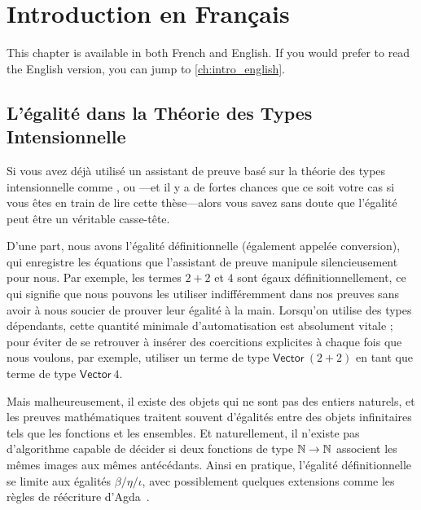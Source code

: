 \setchapterpreamble[u]{\margintoc}
\chapter{Introduction en Français}

\begin{kaobox}
  This chapter is available in both French and English. If you would prefer
  to read the English version, you can jump to \cref{ch:intro_english}.
\end{kaobox}

\section{L'égalité dans la Théorie des Types Intensionnelle}

Si vous avez déjà utilisé un assistant de preuve basé sur la théorie des types 
intensionnelle comme \Coq, \Agda ou \Lean---et il y a de fortes chances que 
ce soit votre cas si vous êtes en train de lire cette thèse---alors vous savez 
sans doute que l'égalité peut être un véritable casse-tête.

D'une part, nous avons l'égalité définitionnelle (également appelée conversion), 
qui enregistre les équations que l'assistant de preuve manipule silencieusement 
pour nous. 
% 
% 
Par exemple, les termes \( 2 + 2 \) et \( 4 \) sont égaux définitionnellement, 
ce qui signifie que nous pouvons les utiliser indifféremment dans nos preuves 
sans avoir à nous soucier de prouver leur égalité à la main. 
% 
Lorsqu'on utilise des types dépendants, cette quantité minimale 
d'automatisation est absolument vitale ; pour éviter de se retrouver à insérer 
des coercitions explicites à chaque fois que nous voulons, par exemple, 
utiliser un terme de type \( \mathsf{Vector}\ (2+2) \) en tant que terme de 
type \( \mathsf{Vector}\ 4 \).

Mais malheureusement, il existe des objets qui ne sont pas des entiers 
naturels, et les preuves mathématiques traitent 
souvent d'égalités entre des objets infinitaires tels que les fonctions et les 
ensembles. 
% 
Et naturellement, il n'existe pas d'algorithme capable de décider si deux 
fonctions de type \( \mathbb{N} \to \mathbb{N} \) associent les mêmes images aux mêmes 
antécédants.
% 
Ainsi en pratique, l'égalité définitionnelle se limite aux égalités 
\( \beta / \eta / \iota \), avec possiblement quelques extensions comme les 
règles de réécriture d'Agda~.

